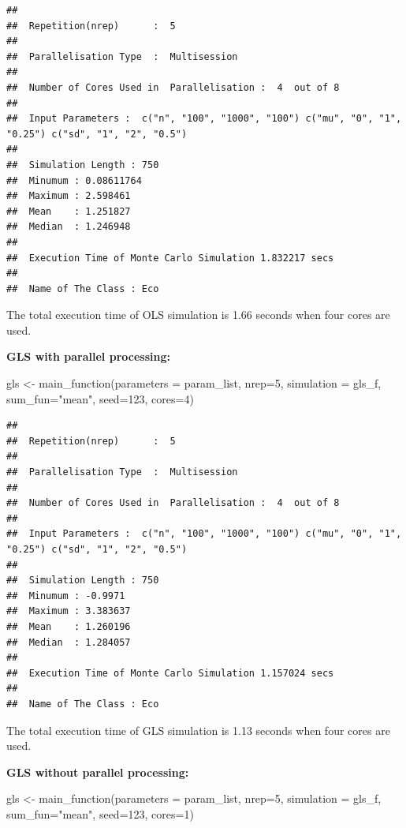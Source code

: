 \documentclass[11pt,a4paper]{article}
\newenvironment{Shaded}{\begin{snugshade}}{\end{snugshade}}
\newcommand{\AttributeTok}[1]{\textcolor[rgb]{0.77,0.63,0.00}{#1}}
\newcommand{\DecValTok}[1]{\textcolor[rgb]{0.00,0.00,0.81}{#1}}
\newcommand{\FunctionTok}[1]{\textcolor[rgb]{0.00,0.00,0.00}{#1}}
\newcommand{\NormalTok}[1]{#1}
\newcommand{\OtherTok}[1]{\textcolor[rgb]{0.56,0.35,0.01}{#1}}
\newcommand{\StringTok}[1]{\textcolor[rgb]{0.31,0.60,0.02}{#1}}
\begin{document}
\begin{verbatim}
## 
##  Repetition(nrep)      :  5 
## 
##  Parallelisation Type  :  Multisession 
## 
##  Number of Cores Used in  Parallelisation :  4  out of 8 
## 
##  Input Parameters :  c("n", "100", "1000", "100") c("mu", "0", "1", "0.25") c("sd", "1", "2", "0.5") 
## 
##  Simulation Length : 750 
##  Minumum : 0.08611764 
##  Maximum : 2.598461 
##  Mean    : 1.251827 
##  Median  : 1.246948 
## 
##  Execution Time of Monte Carlo Simulation 1.832217 secs 
## 
##  Name of The Class : Eco
\end{verbatim}

The total execution time of OLS simulation is 1.66 seconds when four
cores are used.

\textbf{GLS with parallel processing:}

\begin{Shaded}
\begin{Highlighting}[]
\NormalTok{gls }\OtherTok{\textless{}{-}} \FunctionTok{main\_function}\NormalTok{(}\AttributeTok{parameters =}\NormalTok{ param\_list,}
                     \AttributeTok{nrep=}\DecValTok{5}\NormalTok{,}
                     \AttributeTok{simulation =}\NormalTok{ gls\_f,}
                     \AttributeTok{sum\_fun=}\StringTok{"mean"}\NormalTok{,}
                     \AttributeTok{seed=}\DecValTok{123}\NormalTok{,}
                     \AttributeTok{cores=}\DecValTok{4}\NormalTok{)}
\end{Highlighting}
\end{Shaded}

\begin{verbatim}
## 
##  Repetition(nrep)      :  5 
## 
##  Parallelisation Type  :  Multisession 
## 
##  Number of Cores Used in  Parallelisation :  4  out of 8 
## 
##  Input Parameters :  c("n", "100", "1000", "100") c("mu", "0", "1", "0.25") c("sd", "1", "2", "0.5") 
## 
##  Simulation Length : 750 
##  Minumum : -0.9971 
##  Maximum : 3.383637 
##  Mean    : 1.260196 
##  Median  : 1.284057 
## 
##  Execution Time of Monte Carlo Simulation 1.157024 secs 
## 
##  Name of The Class : Eco
\end{verbatim}

The total execution time of GLS simulation is 1.13 seconds when four
cores are used.

\textbf{GLS without parallel processing:}

\begin{Shaded}
\begin{Highlighting}[]
\NormalTok{gls }\OtherTok{\textless{}{-}} \FunctionTok{main\_function}\NormalTok{(}\AttributeTok{parameters =}\NormalTok{ param\_list,}
                     \AttributeTok{nrep=}\DecValTok{5}\NormalTok{,}
                     \AttributeTok{simulation =}\NormalTok{ gls\_f,}
                     \AttributeTok{sum\_fun=}\StringTok{"mean"}\NormalTok{,}
                     \AttributeTok{seed=}\DecValTok{123}\NormalTok{,}
                     \AttributeTok{cores=}\DecValTok{1}\NormalTok{)}
\end{Highlighting}
\end{Shaded}
\end{document}

